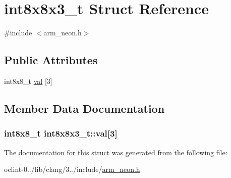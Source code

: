 \hypertarget{structint8x8x3__t}{\section{int8x8x3\-\_\-t Struct Reference}
\label{structint8x8x3__t}
}


{\ttfamily \#include $<$arm\-\_\-neon.\-h$>$}

\subsection*{Public Attributes}
\begin{DoxyCompactItemize}
\item 
int8x8\-\_\-t \hyperlink{structint8x8x3__t_a2e12fbe1fcce5be53f63bea806757ff9}{val} \mbox{[}3\mbox{]}
\end{DoxyCompactItemize}


\subsection{Member Data Documentation}
\hypertarget{structint8x8x3__t_a2e12fbe1fcce5be53f63bea806757ff9}{
\subsubsection[{val}]{\setlength{\rightskip}{0pt plus 5cm}int8x8\-\_\-t int8x8x3\-\_\-t\-::val\mbox{[}3\mbox{]}}}\label{structint8x8x3__t_a2e12fbe1fcce5be53f63bea806757ff9}


The documentation for this struct was generated from the following file\-:\begin{DoxyCompactItemize}
\item 
oclint-\/0../lib/clang/3../include/\hyperlink{arm__neon_8h}{arm\-\_\-neon.\-h}\end{DoxyCompactItemize}
